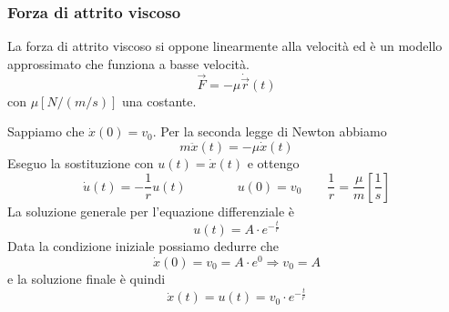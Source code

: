 \subsubsection{Forza di attrito viscoso}
La forza di attrito viscoso si oppone linearmente alla velocità ed è un modello approssimato che funziona a basse velocità.
\begin{equation}
	\vec{F}=-\mu\dot{\vec{r}}(t)
\end{equation}
con $\mu [N/(m/s)]$ una costante.

\begin{example}
	Sappiamo che $\dot{x}(0) = v_0$. Per la seconda legge di Newton abbiamo
	\begin{equation*}
		m\ddot{x}(t) = -\mu \dot{x}(t)
	\end{equation*}
	Eseguo la sostituzione con $u(t) = \dot{x}(t)$ e ottengo
	\begin{equation*}
		\dot{u}(t) = -\frac{1}{r} u(t) \qquad\qquad u(0)=v_0 \qquad \frac{1}{r}=\frac{\mu}{m}[\frac{1}{s}]
	\end{equation*}
	La soluzione generale per l'equazione differenziale è
	\begin{equation*}
		u(t) = A \cdot e^{-\frac{t}{r}}
	\end{equation*}
	Data  la condizione iniziale possiamo dedurre che
	\begin{equation*}
		\dot{x}(0) = v_0 = A \cdot e^0 \Longrightarrow v_0 = A
	\end{equation*}
	e la soluzione finale è quindi
	\begin{equation}
		\dot{x}(t) = u(t) = v_0 \cdot e^{-\frac{t}{r}}
	\end{equation}
\end{example}

